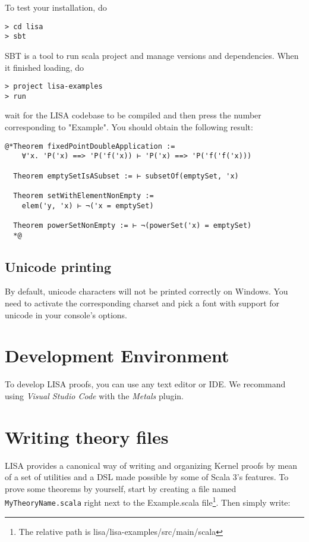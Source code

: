 To test your installation, do
\begin{lstlisting}[language=console]
> cd lisa
> sbt
\end{lstlisting}

SBT is a tool to run scala project and manage versions and dependencies. When it finished loading, do
\begin{lstlisting}[language=console]
> project lisa-examples
> run
\end{lstlisting}
wait for the LISA codebase to be compiled and then press the number corresponding to "Example". You should obtain the following result:
\noindent\begin{minipage}{\linewidth}\vspace{1em}
\begin{lstlisting}[language=console]
  @*Theorem fixedPointDoubleApplication := 
    ∀'x. 'P('x) ==> 'P('f('x)) ⊢ 'P('x) ==> 'P('f('f('x)))

  Theorem emptySetIsASubset := ⊢ subsetOf(emptySet, 'x)

  Theorem setWithElementNonEmpty := 
    elem('y, 'x) ⊢ ¬('x = emptySet)

  Theorem powerSetNonEmpty := ⊢ ¬(powerSet('x) = emptySet)
  *@
\end{lstlisting}
\end{minipage}

\subsection*{Unicode printing}
By default, unicode characters will not be printed correctly on Windows. You need to activate the corresponding charset and pick a font with support for unicode in your console's options.

\section{Development Environment}
To develop LISA proofs, you can use any text editor or IDE. We recommand using \emph{Visual Studio Code} with the \emph{Metals} plugin.

\section{Writing theory files}
LISA provides a canonical way of writing and organizing Kernel proofs by mean of a set of utilities and a DSL made possible by some of Scala 3's features.
To prove some theorems by yourself, start by creating a file named \lstinline|MyTheoryName.scala| right next to the Example.scala file\footnote{The relative path is lisa/lisa-examples/src/main/scala}.
Then simply write:

